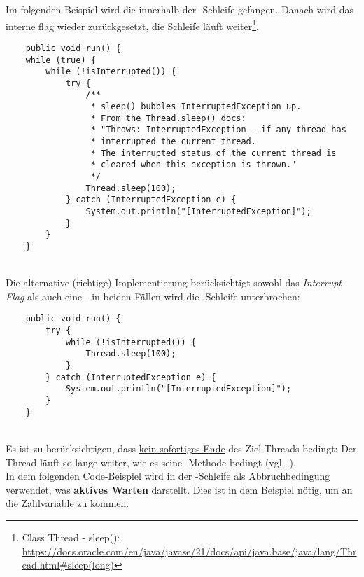 \noindent
Im folgenden Beispiel wird die  innerhalb der -Schleife gefangen.
Danach wird das interne flag wieder zurückgesetzt, die Schleife läuft weiter\footnote{
    Class Thread - sleep(): \url{https://docs.oracle.com/en/java/javase/21/docs/api/java.base/java/lang/Thread.html#sleep(long)}
}.
\begin{verbatim}
    public void run() {
    while (true) {
        while (!isInterrupted()) {
            try {
                /**
                 * sleep() bubbles InterruptedException up.
                 * From the Thread.sleep() docs:
                 * "Throws: InterruptedException – if any thread has
                 * interrupted the current thread.
                 * The interrupted status of the current thread is
                 * cleared when this exception is thrown."
                 */
                Thread.sleep(100);
            } catch (InterruptedException e) {
                System.out.println("[InterruptedException]");
            }
        }
    }
\end{verbatim}\\

\noindent
Die alternative (richtige) Implementierung berücksichtigt sowohl das \textit{Interrupt-Flag} als auch eine  - in beiden Fällen wird die -Schleife unterbrochen:

\begin{verbatim}
    public void run() {
        try {
            while (!isInterrupted()) {
                Thread.sleep(100);
            }
        } catch (InterruptedException e) {
            System.out.println("[InterruptedException]");
        }
    }
\end{verbatim}\\

Es ist zu berücksichtigen, dass  \ul{kein sofortiges Ende} des Ziel-Threads bedingt: Der Thread läuft so lange weiter, wie es seine -Methode bedingt (vgl.~\cite[44 f.]{Oec22}).\\
In dem folgenden Code-Beispiel wird in der -Schleife  als Abbruchbedingung verwendet, was \textbf{aktives Warten} darstellt.
Dies ist in dem Beispiel nötig, um an die Zählvariable zu kommen.

